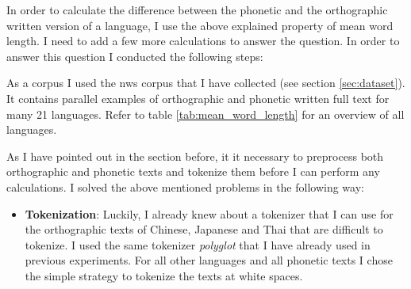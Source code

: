 In order to calculate the difference between the phonetic and the orthographic written version of a language, I use the above explained property of mean word length. I need to add a few more calculations to answer the question. In order to answer this question I conducted the following steps:

\begin{description}[style=unboxed]
\item[\textsc{1. step - Corpus}:] As a corpus I used the \ac{nws} corpus that I have collected (see section \ref{sec:dataset}). It contains parallel examples of orthographic and phonetic written full text for many 21 languages. Refer to table \ref{tab:mean_word_length} for an overview of all languages.
\item[\textsc{2. step - Preprocessing}:] As I have pointed out in the section before, it it necessary to preprocess both orthographic and phonetic texts and tokenize them before I can perform any calculations. I solved the above mentioned problems in the following way:
\begin{itemize}
    \item \textbf{Tokenization}: Luckily, I already knew about a tokenizer that I can use for the orthographic texts of Chinese, Japanese and Thai that are difficult to tokenize. I used the same tokenizer \textit{polyglot} that I have already used in previous experiments. For all other languages and all phonetic texts I chose the simple strategy to tokenize the texts at white spaces. 


\end{itemize}
\end{description}
